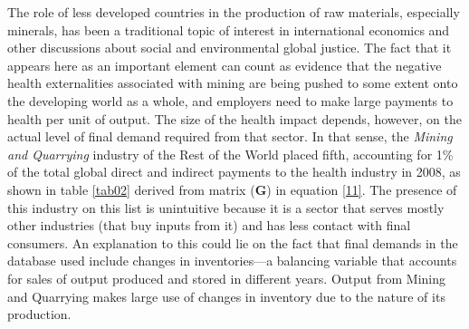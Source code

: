 \documentclass[a4paper,12pt]{article}
\begin{document}
The role of less developed countries in the production of raw materials, especially minerals, has been a traditional topic of interest in international economics and other discussions about social and environmental global justice. The fact that it appears here as an important element can count as evidence that the negative health externalities associated with mining are being pushed to some extent onto the developing world as a whole, and employers need to make large payments to health per unit of output. The size of the health impact depends, however, on the actual level of final demand required from that sector. In that sense, the \textit{Mining and Quarrying} industry of the Rest of the World placed fifth, accounting for 1\% of the total global direct and indirect payments to the health industry in 2008, as shown in table \ref{tab02} derived from matrix ($\mathbf{G}$) in equation \ref{11}. The presence of this industry on this list is unintuitive because it is a sector that serves mostly other industries (that buy inputs from it) and has less contact with final consumers. An explanation to this could lie on the fact that final demands in the database used include changes in inventories---a balancing variable that accounts for sales of output produced and stored in different years. Output from Mining and Quarrying makes large use of changes in inventory due to the nature of its production.
\end{document}

